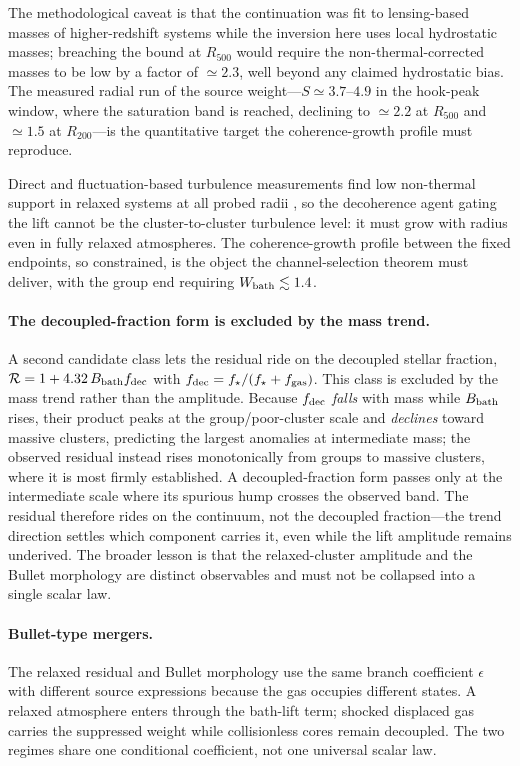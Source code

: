 \documentclass[11pt]{article}
\begin{document}
The methodological caveat is that the continuation was fit to lensing-based masses of higher-redshift systems while the inversion here uses local hydrostatic masses; breaching the bound at $R_{500}$ would require the non-thermal-corrected masses to be low by a factor of $\simeq2.3$, well beyond any claimed hydrostatic bias. The measured radial run of the source weight---$S\simeq3.7$--$4.9$ in the hook-peak window, where the saturation band is reached, declining to $\simeq2.2$ at $R_{500}$ and $\simeq1.5$ at $R_{200}$---is the quantitative target the coherence-growth profile must reproduce.

Direct and fluctuation-based turbulence measurements find low non-thermal support in relaxed systems at all probed radii \citep{Dupourque2023,XRISM2025}, so the decoherence agent gating the lift cannot be the cluster-to-cluster turbulence level: it must grow with radius even in fully relaxed atmospheres. The coherence-growth profile between the fixed endpoints, so constrained, is the object the channel-selection theorem must deliver, with the group end requiring $W_{\rm bath}\lesssim1.4$.

\paragraph{The decoupled-fraction form is excluded by the mass trend.}
A second candidate class lets the residual ride on the decoupled stellar fraction, $\mathcal R=1+4.32\,B_{\rm bath}f_{\rm dec}$ with $f_{\rm dec}=f_\star/(f_\star+f_{\rm gas})$. This class is excluded by the mass trend rather than the amplitude. Because $f_{\rm dec}$ \emph{falls} with mass while $B_{\rm bath}$ rises, their product peaks at the group/poor-cluster scale and \emph{declines} toward massive clusters, predicting the largest anomalies at intermediate mass; the observed residual instead rises monotonically from groups to massive clusters, where it is most firmly established. A decoupled-fraction form passes only at the intermediate scale where its spurious hump crosses the observed band. The residual therefore rides on the continuum, not the decoupled fraction---the trend direction settles which component carries it, even while the lift amplitude remains underived. The broader lesson is that the relaxed-cluster amplitude and the Bullet morphology are distinct observables and must not be collapsed into a single scalar law.

\paragraph{Bullet-type mergers.}
The relaxed residual and Bullet morphology use the same branch coefficient $\epsilon$ with different source expressions because the gas occupies different states. A relaxed atmosphere enters through the bath-lift term; shocked displaced gas carries the suppressed weight while collisionless cores remain decoupled. The two regimes share one conditional coefficient, not one universal scalar law.
\end{document}
